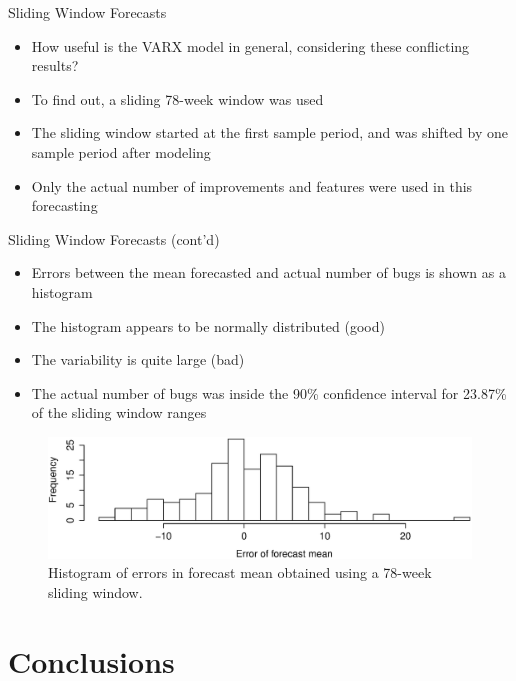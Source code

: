 \documentclass[presentation]{beamer}
\begin{document}
\begin{frame}[t]{Sliding Window Forecasts}
\begin{itemize}
\item{How useful is the VARX model in general, considering these conflicting results?}
\item{To find out, a sliding 78-week window was used}
\item{The sliding window started at the first sample period, and was shifted by one sample period after modeling}
\item{Only the actual number of improvements and features were used in this forecasting}
\end{itemize}
\end{frame}

\begin{frame}[t]{Sliding Window Forecasts (cont'd)}
\footnotesize{
\begin{itemize}
\item{Errors between the mean forecasted and actual number of bugs is shown as a histogram}
\item{The histogram appears to be normally distributed (good)}
\item{The variability is quite large (bad)}
\item{The actual number of bugs was inside the 90\% confidence interval for 23.87\% of the sliding window ranges}
\end{itemize}
\vspace{-.5cm}
\begin{figure}[htbp]
\begin{center}
\includegraphics[width=.9\textwidth]{assets/forecast_errors.eps}
\caption{Histogram of errors in forecast mean obtained using a 78-week sliding window.}
\end{center}
\end{figure}
}
\end{frame}


\section{Conclusions}
\end{document}

